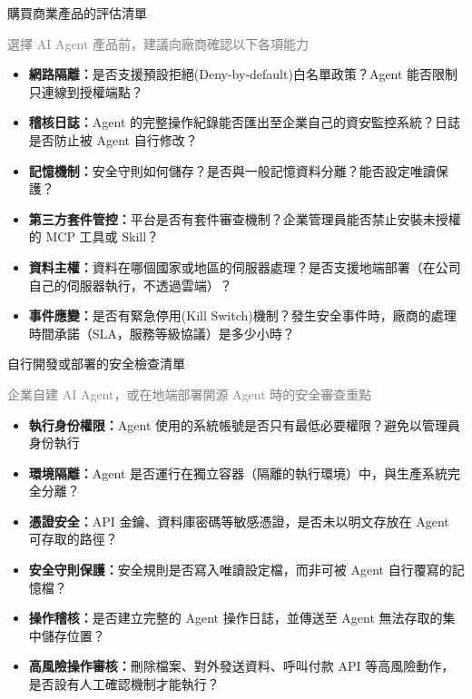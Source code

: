 \documentclass[aspectratio=1610]{Common/MyCourseBeamer}
\begin{document}
\begin{frame}[allowframebreaks=0.85]{購買商業產品的評估清單}

	{\scriptsize\textcolor{gray}{選擇 AI Agent 產品前，建議向廠商確認以下各項能力}}\vspace{0.3em}

	\begin{itemize}
		\item \textbf{網路隔離：}是否支援預設拒絕(Deny-by-default)白名單政策？Agent 能否限制只連線到授權端點？

		\item \textbf{稽核日誌：}Agent 的完整操作紀錄能否匯出至企業自己的資安監控系統？\alert{日誌是否防止被 Agent 自行修改？}

		\item \textbf{記憶機制：}安全守則如何儲存？是否與一般記憶資料分離？能否設定唯讀保護？

		\framebreak
		\item \textbf{第三方套件管控：}平台是否有套件審查機制？企業管理員能否禁止安裝未授權的 MCP 工具或 Skill？

		\item \textbf{資料主權：}資料在哪個國家或地區的伺服器處理？是否支援地端部署（在公司自己的伺服器執行，不透過雲端）？

		\item \textbf{事件應變：}是否有緊急停用(Kill Switch)機制？發生安全事件時，廠商的處理時間承諾（SLA，服務等級協議）是多少小時？
	\end{itemize}

\end{frame}


\begin{frame}[allowframebreaks=0.85]{自行開發或部署的安全檢查清單}

	{\scriptsize\textcolor{gray}{企業自建 AI Agent，或在地端部署開源 Agent 時的安全審查重點}}\vspace{0.3em}

	\begin{itemize}
		\item \textbf{執行身份權限：}Agent 使用的系統帳號是否只有最低必要權限？避免以管理員身份執行

		\item \textbf{環境隔離：}Agent 是否運行在獨立容器（隔離的執行環境）中，與生產系統完全分離？

		\item \textbf{憑證安全：}API 金鑰、資料庫密碼等敏感憑證，是否\alert{未以明文}存放在 Agent 可存取的路徑？

		\framebreak
		\item \textbf{安全守則保護：}安全規則是否寫入唯讀設定檔，而非可被 Agent 自行覆寫的記憶檔？

		\item \textbf{操作稽核：}是否建立完整的 Agent 操作日誌，並傳送至 Agent 無法存取的集中儲存位置？

		\item \textbf{高風險操作審核：}刪除檔案、對外發送資料、呼叫付款 API 等高風險動作，是否設有人工確認機制才能執行？
	\end{itemize}

\end{frame}
\end{document}
